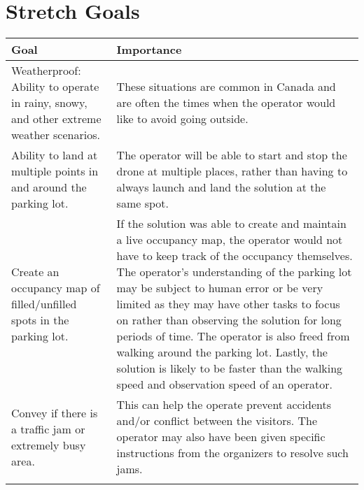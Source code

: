 \documentclass{article}
\begin{document}
\section{Stretch Goals}
\begin{tabular}{ | m{7cm} | m{7cm} | } 
  \hline
  Goal & Importance \\ 
  \hline
  Weatherproof: Ability to operate in rainy, snowy, and other extreme weather scenarios.
& These situations are common in Canada and are often the times when the operator would like to avoid going outside.

  \\ 
  \hline
  Ability to land at multiple points in and around the parking lot.
 & The operator will be able to start and stop the drone at multiple places, rather than having to always launch and land the solution at the same spot.
 
 \\ 
  \hline
  Create an occupancy map of filled/unfilled spots in the parking lot. 
 & If the solution was able to create and maintain a live occupancy map, the operator would not have to keep track of the occupancy themselves. The operator's understanding of the parking lot may be subject to human error or be very limited as they may have other tasks to focus on rather than observing the solution for long periods of time. The operator is also freed from walking around the parking lot. Lastly, the solution is likely to be faster than the walking speed and observation speed of an operator.

 \\ 
  \hline
  Convey if there is a traffic jam or extremely busy area.
 & This can help the operate prevent accidents and/or conflict between the visitors. The operator may also have been given specific instructions from the organizers to resolve such jams.
 \\ 
  
 \\ 
  \hline
\end{tabular}
\end{document}
